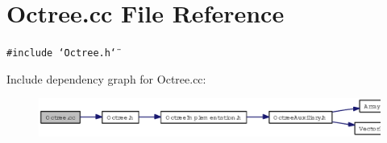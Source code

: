 \section{Octree.cc File Reference}
\label{Octree_8cc}
{\tt \#include \char`\"{}Octree.h\char`\"{}}\par


Include dependency graph for Octree.cc:\begin{figure}[H]
\begin{center}
\leavevmode
\includegraphics[width=369pt]{Octree_8cc__incl}
\end{center}
\end{figure}
